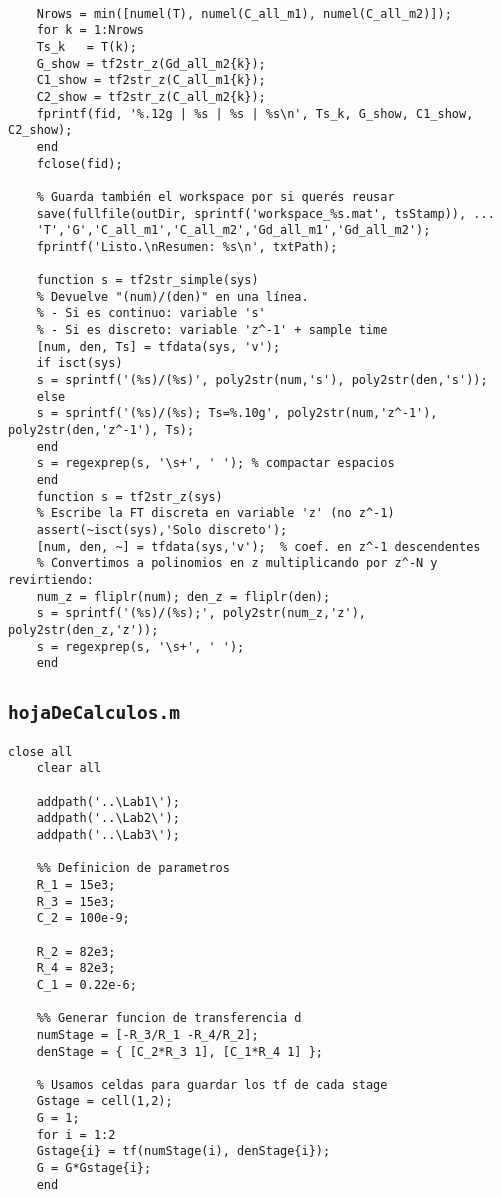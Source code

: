 {\begin{lstlisting}[style=matlabstyle,caption={Guardado de resultados y figuras.}]
	% String "limpio" de G continua (única para todas las filas)
	
	Nrows = min([numel(T), numel(C_all_m1), numel(C_all_m2)]);
	for k = 1:Nrows
	Ts_k   = T(k);
	G_show = tf2str_z(Gd_all_m2{k});
	C1_show = tf2str_z(C_all_m1{k});
	C2_show = tf2str_z(C_all_m2{k});
	fprintf(fid, '%.12g | %s | %s | %s\n', Ts_k, G_show, C1_show, C2_show);
	end
	fclose(fid);
	
	% Guarda también el workspace por si querés reusar
	save(fullfile(outDir, sprintf('workspace_%s.mat', tsStamp)), ...
	'T','G','C_all_m1','C_all_m2','Gd_all_m1','Gd_all_m2');
	fprintf('Listo.\nResumen: %s\n', txtPath);
	
	function s = tf2str_simple(sys)
	% Devuelve "(num)/(den)" en una línea.
	% - Si es continuo: variable 's'
	% - Si es discreto: variable 'z^-1' + sample time
	[num, den, Ts] = tfdata(sys, 'v');
	if isct(sys)
	s = sprintf('(%s)/(%s)', poly2str(num,'s'), poly2str(den,'s'));
	else
	s = sprintf('(%s)/(%s); Ts=%.10g', poly2str(num,'z^-1'), poly2str(den,'z^-1'), Ts);
	end
	s = regexprep(s, '\s+', ' '); % compactar espacios
	end
	function s = tf2str_z(sys)
	% Escribe la FT discreta en variable 'z' (no z^-1)
	assert(~isct(sys),'Solo discreto');
	[num, den, ~] = tfdata(sys,'v');  % coef. en z^-1 descendentes
	% Convertimos a polinomios en z multiplicando por z^-N y revirtiendo:
	num_z = fliplr(num); den_z = fliplr(den);
	s = sprintf('(%s)/(%s);', poly2str(num_z,'z'), poly2str(den_z,'z'));
	s = regexprep(s, '\s+', ' ');
	end
\end{lstlisting}

\subsection{\texttt{hojaDeCalculos.m}}
\begin{lstlisting}[style=matlabstyle,caption={Hoja de cálculos para el diseño de los compensadores.}]
	close all
	clear all
	
	addpath('..\Lab1\');
	addpath('..\Lab2\');
	addpath('..\Lab3\');
	
	%% Definicion de parametros
	R_1 = 15e3;
	R_3 = 15e3;
	C_2 = 100e-9;
	
	R_2 = 82e3;
	R_4 = 82e3;
	C_1 = 0.22e-6;
	
	%% Generar funcion de transferencia d
	numStage = [-R_3/R_1 -R_4/R_2];
	denStage = { [C_2*R_3 1], [C_1*R_4 1] };
	
	% Usamos celdas para guardar los tf de cada stage
	Gstage = cell(1,2);
	G = 1;
	for i = 1:2
	Gstage{i} = tf(numStage(i), denStage{i});
	G = G*Gstage{i};
	end
	

\end{lstlisting}}
